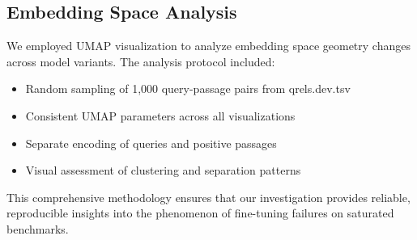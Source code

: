 \subsection{Embedding Space Analysis}

We employed UMAP visualization to analyze embedding space geometry changes across model variants. The analysis protocol included:

\begin{itemize}
\item Random sampling of 1,000 query-passage pairs from qrels.dev.tsv
\item Consistent UMAP parameters across all visualizations
\item Separate encoding of queries and positive passages
\item Visual assessment of clustering and separation patterns
\end{itemize}

This comprehensive methodology ensures that our investigation provides reliable, reproducible insights into the phenomenon of fine-tuning failures on saturated benchmarks.
